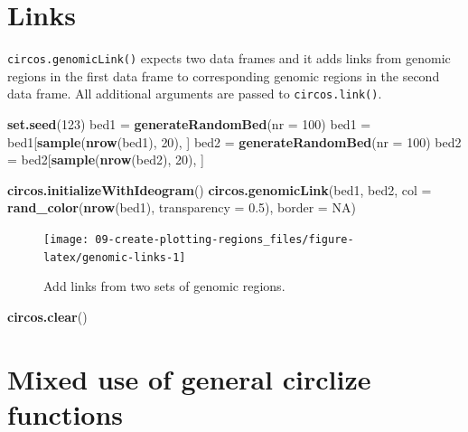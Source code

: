 \documentclass[]{book}
\newenvironment{Shaded}{\begin{snugshade}}{\end{snugshade}}
\newcommand{\KeywordTok}[1]{\textcolor[rgb]{0.13,0.29,0.53}{\textbf{#1}}}
\newcommand{\DataTypeTok}[1]{\textcolor[rgb]{0.13,0.29,0.53}{#1}}
\newcommand{\DecValTok}[1]{\textcolor[rgb]{0.00,0.00,0.81}{#1}}
\newcommand{\FloatTok}[1]{\textcolor[rgb]{0.00,0.00,0.81}{#1}}
\newcommand{\StringTok}[1]{\textcolor[rgb]{0.31,0.60,0.02}{#1}}
\newcommand{\OtherTok}[1]{\textcolor[rgb]{0.56,0.35,0.01}{#1}}
\newcommand{\NormalTok}[1]{#1}
\theoremstyle{definition}
\theoremstyle{definition}
\theoremstyle{remark}
\begin{document}
\section{Links}\label{genomic-links}

\texttt{circos.genomicLink()} expects two data frames and it adds links
from genomic regions in the first data frame to corresponding genomic
regions in the second data frame. All additional arguments are passed to
\texttt{circos.link()}.

\begin{Shaded}
\begin{Highlighting}[]
\KeywordTok{set.seed}\NormalTok{(}\DecValTok{123}\NormalTok{)}
\NormalTok{bed1 =}\StringTok{ }\KeywordTok{generateRandomBed}\NormalTok{(}\DataTypeTok{nr =} \DecValTok{100}\NormalTok{)}
\NormalTok{bed1 =}\StringTok{ }\NormalTok{bed1[}\KeywordTok{sample}\NormalTok{(}\KeywordTok{nrow}\NormalTok{(bed1), }\DecValTok{20}\NormalTok{), ]}
\NormalTok{bed2 =}\StringTok{ }\KeywordTok{generateRandomBed}\NormalTok{(}\DataTypeTok{nr =} \DecValTok{100}\NormalTok{)}
\NormalTok{bed2 =}\StringTok{ }\NormalTok{bed2[}\KeywordTok{sample}\NormalTok{(}\KeywordTok{nrow}\NormalTok{(bed2), }\DecValTok{20}\NormalTok{), ]}

\KeywordTok{circos.initializeWithIdeogram}\NormalTok{()}
\KeywordTok{circos.genomicLink}\NormalTok{(bed1, bed2, }\DataTypeTok{col =} \KeywordTok{rand_color}\NormalTok{(}\KeywordTok{nrow}\NormalTok{(bed1), }\DataTypeTok{transparency =} \FloatTok{0.5}\NormalTok{), }
    \DataTypeTok{border =} \OtherTok{NA}\NormalTok{)}
\end{Highlighting}
\end{Shaded}

\begin{figure}

{\centering \texttt{[image: 09-create-plotting-regions\_files/figure-latex/genomic-links-1]} 

}

\caption{Add links from two sets of genomic regions.}\label{fig:genomic-links}
\end{figure}

\begin{Shaded}
\begin{Highlighting}[]
\KeywordTok{circos.clear}\NormalTok{()}
\end{Highlighting}
\end{Shaded}

\section{Mixed use of general circlize
functions}\label{mixed-use-of-general-circlize-functions}
\end{document}
